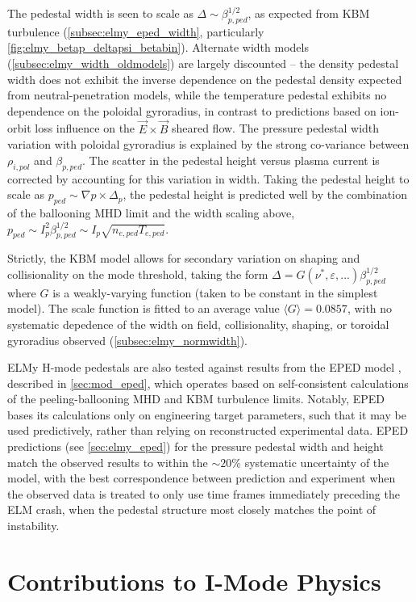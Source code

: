 The pedestal width is seen to scale as $\Delta \sim \beta_{p,ped}^{1/2}$, as expected from KBM turbulence (\cf \cref{subsec:elmy_eped_width}, particularly \cref{fig:elmy_betap_deltapsi_betabin}).  Alternate width models (\cref{subsec:elmy_width_oldmodels}) are largely discounted -- the density pedestal width does not exhibit the inverse dependence on the pedestal density expected from neutral-penetration models, while the temperature pedestal exhibits no dependence on the poloidal gyroradius, in contrast to predictions based on ion-orbit loss influence on the $\vec{E}\times\vec{B}$ sheared flow.  The pressure pedestal width variation with poloidal gyroradius is explained by the strong co-variance between $\rho_{i,pol}$ and $\beta_{p,ped}$.  The scatter in the pedestal height versus plasma current is corrected by accounting for this variation in width.  Taking the pedestal height to scale as $p_{ped} \sim \nabla p \times \Delta_p$, the pedestal height is predicted well by the combination of the ballooning MHD limit and the width scaling above, $p_{ped} \sim I_p^2 \beta_{p,ped}^{1/2} \sim I_p \sqrt{n_{e,ped} T_{e,ped}}$.

Strictly, the KBM model allows for secondary variation on shaping and collisionality on the mode threshold, taking the form $\Delta = G(\nu^*,\varepsilon,...) \beta_{p,ped}^{1/2}$ where $G$ is a weakly-varying function (taken to be constant in the simplest model).  The scale function is fitted to an average value $\langle G \rangle = 0.0857$, with no systematic depedence of the width on field, collisionality, shaping, or toroidal gyroradius observed (\cref{subsec:elmy_normwidth}).  

ELMy H-mode pedestals are also tested against results from the EPED model \cite{Snyder2011}, described in \cref{sec:mod_eped}, which operates based on self-consistent calculations of the peeling-ballooning MHD and KBM turbulence limits.  Notably, EPED bases its calculations only on engineering target parameters, such that it may be used predictively, rather than relying on reconstructed experimental data.  EPED predictions (see \cref{sec:elmy_eped}) for the pressure pedestal width and height match the observed results to within the $\sim 20\%$ systematic uncertainty of the model, with the best correspondence between prediction and experiment when the observed data is treated to only use time frames immediately preceding the ELM crash, when the pedestal structure most closely matches the point of instability.\nicesectionending

\section{Contributions to I-Mode Physics}\label{sec:conc_imode}

